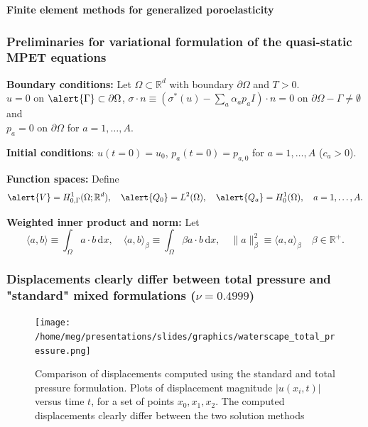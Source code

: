 \documentclass[10pt, mathserif, aspectratio=169, t]{beamer}
\newcommand{\R}{\mathbb{R}}
\newcommand{\inner}[2]{\langle #1,  #2\rangle}
\newcommand{\dx}{\, \mathrm{d}x}
\newcommand{\mysection}[1]{\begin{frame} \begin{center} \vspace{3em} \textbf{#1} \end{center} \end{frame}}
\DeclareMathOperator{\ssum}{\textstyle \sum}
\begin{document}


\mysection{Finite element methods for generalized poroelasticity}

\begin{frame}
  \frametitle{Preliminaries for variational formulation of the
    quasi-static MPET equations}

  \textbf{Boundary conditions:} Let $\Omega \subset \R^d$ with boundary
  $\partial \Omega$ and $T > 0$. \\ $u = 0$ on $\alert{\Gamma} \subset \partial
  \Omega$, $\sigma \cdot n \equiv (\sigma^{\ast}(u) - \ssum_{a}
  \alpha_a p_a I) \cdot n = 0$ on $\partial \Omega - \Gamma \not =
  \emptyset$ and \\ $p_a = 0$ on $\partial \Omega$ for $a = 1, \dots, A$.

  \medskip
  
  \textbf{Initial conditions}: $u(t = 0) = u_0$, $p_a(t = 0) = p_{a,
    0}$ for $a = 1, \dots, A$ ($c_a > 0$).

  \bigskip
  
  \textbf{Function spaces:} Define
  \begin{equation*}
    \alert{V} = H^1_{0, \Gamma}(\Omega; \R^d),
    \quad
    \alert{Q_0} = L^2(\Omega),
    \quad
    \alert{Q_a} = H^1_0(\Omega), \quad a = 1, \dots, A.
  \end{equation*}

  \bigskip

  \textbf{Weighted inner product and norm:} Let
  \begin{equation*}
    \inner{a}{b} \equiv \int_{\Omega} a \cdot b \dx,
    \quad
    \inner{a}{b}_{\beta} \equiv \int_{\Omega} \beta a \cdot b \dx,
    \quad
    \| a \|_{\beta}^2 \equiv \inner{a}{a}_{\beta}
    \quad
    \beta \in \R^{+} .
  \end{equation*}
\end{frame}






\begin{frame}
  \frametitle{Displacements clearly differ between total pressure and "standard" mixed formulations ($\nu = 0.4999$)}
  \centering
  \begin{figure}
  \texttt{[image: /home/meg/presentations/slides/graphics/waterscape\_total\_pressure.png]}
  \caption{Comparison of displacements computed using the standard and
    total pressure formulation. Plots of displacement magnitude
    $|u(x_i, t)|$ versus time $t$, for a set of points $x_0, x_1,
    x_2$. The computed displacements clearly differ between the two
    solution methods}
  \end{figure}
\end{frame}
\end{document}
